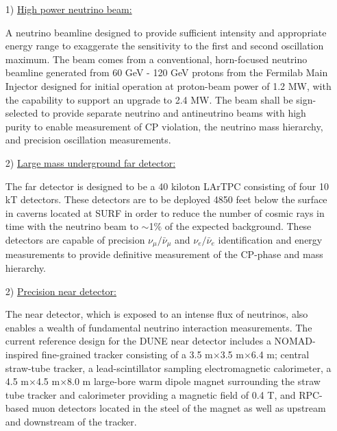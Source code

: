 \begin{itemize}
\item[1)] \underline{High power neutrino beam:}

A neutrino beamline designed to provide sufficient intensity and appropriate energy range to exaggerate the sensitivity to the first and second oscillation maximum. The beam comes from a conventional, horn-focused neutrino beamline generated from 60 GeV - 120 GeV protons from the Fermilab Main Injector designed for initial operation at proton-beam power of 1.2 MW, with the capability to support an upgrade to 2.4 MW. The beam shall be sign-selected to provide separate neutrino and antineutrino beams with high purity to enable measurement of CP violation, the neutrino mass hierarchy, and precision oscillation measurements.

\item[2)] \underline{Large mass underground far detector:}

The far detector is designed to be a 40 kiloton LArTPC consisting of four 10 kT detectors. These detectors are to be deployed 4850 feet below the surface in caverns located at SURF in order to reduce the number of cosmic rays in time with the neutrino beam to $\sim$1$\%$ of the expected background. These detectors are capable of precision ${\nu}_{\mu} / \bar{\nu}_{\mu}$ and ${\nu}_{e} / \bar{\nu}_{e}$ identification and energy measurements to provide definitive measurement of the CP-phase and mass hierarchy.

\item[2)] \underline{Precision near detector:}

The near detector, which is exposed to an intense flux of neutrinos, also enables a wealth of fundamental neutrino interaction measurements. The current reference design for the DUNE near detector includes a NOMAD-inspired \cite{nomad} fine-grained tracker consisting of a 3.5 m$\times$3.5 m$\times$6.4 m; central straw-tube tracker, a lead-scintillator sampling electromagnetic calorimeter, a 4.5 m$\times$4.5 m$\times$8.0 m large-bore warm dipole magnet surrounding the straw tube tracker and calorimeter providing a magnetic field of 0.4 T, and RPC-based muon detectors located in the steel of the magnet as well as upstream and downstream of the tracker.

\end{itemize}


